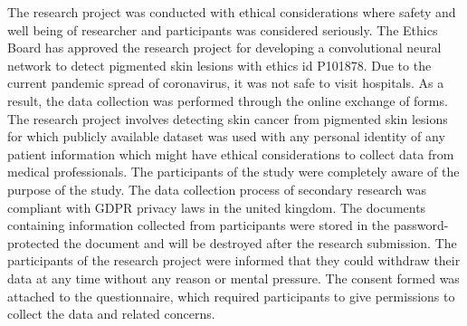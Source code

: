 The research project was conducted with ethical considerations where safety and well being of researcher and participants was considered seriously. The Ethics Board has approved the research project for developing a convolutional neural network to detect pigmented skin lesions with ethics id P101878. Due to the current pandemic spread of coronavirus, it was not safe to visit hospitals. As a result, the data collection was performed through the online exchange of forms. The research project involves detecting skin cancer from pigmented skin lesions for which publicly available dataset was used with any personal identity of any patient information which might have ethical considerations to collect data from medical professionals. 
The participants of the study were completely aware of the purpose of the study. The data collection process of secondary research was compliant with GDPR privacy laws in the united kingdom. The documents containing information collected from participants were stored in the password-protected the document and will be destroyed after the research submission. The participants of the research project were informed that they could withdraw their data at any time without any reason or mental pressure. The consent formed was attached to the questionnaire, which required participants to give permissions to collect the data and related concerns.
